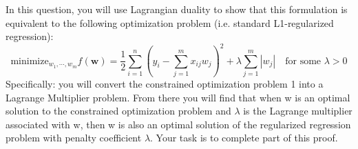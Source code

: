 \documentclass{article}
\renewcommand{\vec}[1]{\boldsymbol{#1}}
\begin{document}
In this question, you will use Lagrangian duality to show that this formulation is equivalent to the following optimization problem (i.e. standard L1-regularized regression):
\begin{equation} \label{eq:dual}
\text{minimize}_{w_1,\cdots, w_m}f(\vec{w})=\frac{1}{2}\sum^n_{i=1}(y_i-\sum^m_{j=1}x_{ij}w_j)^2+\lambda\sum^m_{j=1}|w_j|\quad\text{for some $\lambda>0$}
\end{equation}
Specifically: you will convert the constrained optimization problem 1 into a Lagrange Multiplier problem. From there you will find that when w is an optimal solution to the constrained optimization problem and $\lambda$ is the Lagrange multiplier associated with w, then w is also an optimal solution of the regularized regression problem with penalty coefficient $\lambda$. Your task is to complete part of this proof.
\end{document}

